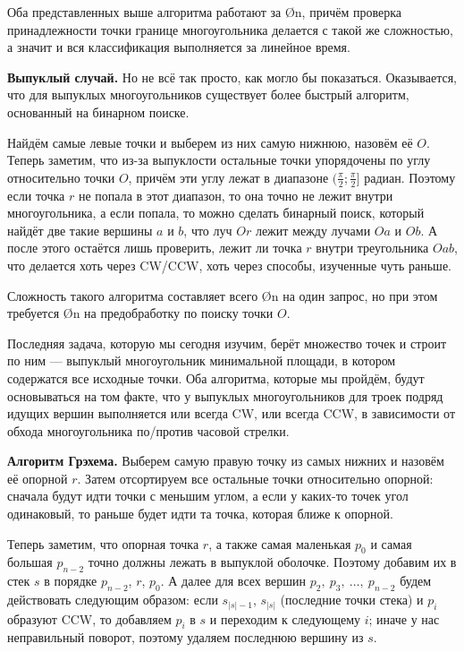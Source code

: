 Оба представленных выше алгоритма работают за \O{n}, причём проверка принадлежности точки границе многоугольника делается с такой же сложностью, а значит и вся классификация выполняется за линейное время.

\textbf{Выпуклый случай.} Но не всё так просто, как могло бы показаться. Оказывается, что для выпуклых многоугольников существует более быстрый алгоритм, основанный на бинарном поиске.

Найдём самые левые точки и выберем из них самую нижнюю, назовём её $O$. Теперь заметим, что из-за выпуклости остальные точки упорядочены по углу относительно точки $O$, причём эти углу лежат в диапазоне $(\frac{\pi}{2}; \frac{\pi}{2}]$ радиан. Поэтому если точка $r$ не попала в этот диапазон, то она точно не лежит внутри многоугольника, а если попала, то можно сделать бинарный поиск, который найдёт две такие вершины $a$ и $b$, что луч $Or$ лежит между лучами $Oa$ и $Ob$. А после этого остаётся лишь проверить, лежит ли точка $r$ внутри треугольника $Oab$, что делается хоть через CW/CCW, хоть через способы, изученные чуть раньше.

Сложность такого алгоритма составляет всего \O{\log n} на один запрос, но при этом требуется \O{n} на предобработку по поиску точки $O$.


Последняя задача, которую мы сегодня изучим, берёт множество точек и строит по ним  — выпуклый многоугольник минимальной площади, в котором содержатся все исходные точки. Оба алгоритма, которые мы пройдём, будут основываться на том факте, что у выпуклых многоугольников для троек подряд идущих вершин выполняется или всегда CW, или всегда CCW, в зависимости от обхода многоугольника по/против часовой стрелки.

\textbf{Алгоритм Грэхема.} Выберем самую правую точку из самых нижних и назовём её опорной $r$. Затем отсортируем все остальные точки относительно опорной: сначала будут идти точки с меньшим углом, а если у каких-то точек угол одинаковый, то раньше будет идти та точка, которая ближе к опорной.

Теперь заметим, что опорная точка $r$, а также самая маленькая $p_0$ и самая большая $p_{n-2}$ точно должны лежать в выпуклой оболочке. Поэтому добавим их в стек $s$ в порядке $p_{n-2}$, $r$, $p_0$. А далее для всех вершин $p_2,\ p_3,\ \ldots,\ p_{n-2}$ будем действовать следующим образом: если $s_{|s|-1}$, $s_{|s|}$ (последние точки стека) и $p_i$ образуют CCW, то добавляем $p_i$ в $s$ и переходим к следующему $i$; иначе у нас неправильный поворот, поэтому удаляем последнюю вершину из $s$.

